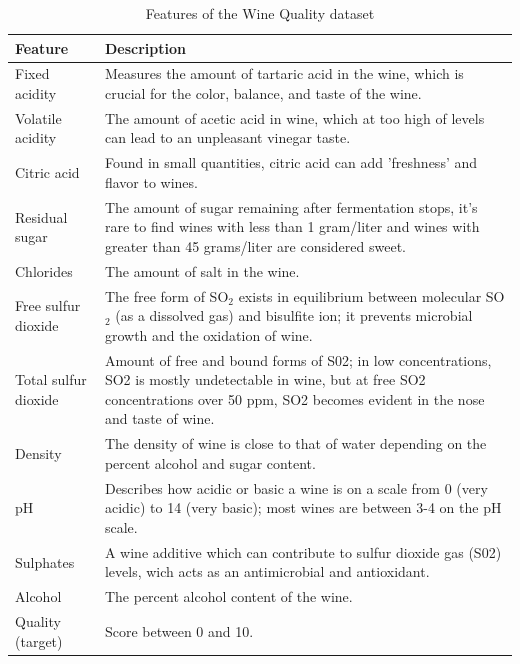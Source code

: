 \documentclass{ieeeaccess}
\begin{document}
\begin{table}[h!]
    \centering
    \begin{tabular}{|>{\raggedright\arraybackslash}p{4cm}|>{\raggedright\arraybackslash}p{8cm}|}
    \hline
    \textbf{Feature} & \textbf{Description} \\
    \hline
    Fixed acidity & Measures the amount of tartaric acid in the wine, which is crucial for the color, balance, and taste of the wine. \\
    \hline
    Volatile acidity & The amount of acetic acid in wine, which at too high of levels can lead to an unpleasant vinegar taste. \\
    \hline
    Citric acid & Found in small quantities, citric acid can add 'freshness' and flavor to wines. \\
    \hline
    Residual sugar & The amount of sugar remaining after fermentation stops, it's rare to find wines with less than 1 gram/liter and wines with greater than 45 grams/liter are considered sweet. \\
    \hline
    Chlorides & The amount of salt in the wine. \\
    \hline
    Free sulfur dioxide & The free form of SO\(_2\) exists in equilibrium between molecular SO\(_2\) (as a dissolved gas) and bisulfite ion; it prevents microbial growth and the oxidation of wine. \\
    \hline
    Total sulfur dioxide & Amount of free and bound forms of S02; in low concentrations, SO2 is mostly undetectable in wine, but at free SO2 concentrations over 50 ppm, SO2 becomes evident in the nose and taste of wine. \\
    \hline
    Density & The density of wine is close to that of water depending on the percent alcohol and sugar content. \\
    \hline
    pH & Describes how acidic or basic a wine is on a scale from 0 (very acidic) to 14 (very basic); most wines are between 3-4 on the pH scale. \\
    \hline
    Sulphates & A wine additive which can contribute to sulfur dioxide gas (S02) levels, wich acts as an antimicrobial and antioxidant. \\
    \hline
    Alcohol & The percent alcohol content of the wine. \\
    \hline
    Quality (target) & Score between 0 and 10. \\
    \hline
    \end{tabular}
    \caption{Features of the Wine Quality dataset}
    \label{tbl.2}
    \end{table}
    
\end{document}
